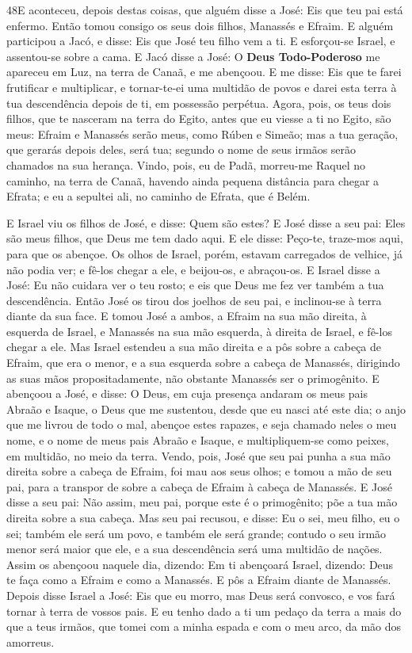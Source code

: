 \smallskip

\lettrine{48} E aconteceu, depois destas coisas, que alguém
disse a José: Eis que teu pai está enfermo. Então tomou consigo os
seus dois filhos, Manassés e Efraim. E alguém participou a Jacó,
e disse: Eis que José teu filho vem a ti. E esforçou-se Israel, e
assentou-se sobre a cama. E Jacó disse a José: O \textbf{Deus
Todo-Poderoso} me apareceu em Luz, na terra de Canaã, e me abençoou.
E me disse: Eis que te farei frutificar e multiplicar, e
tornar-te-ei uma multidão de povos e darei esta terra à tua
descendência depois de ti, em possessão perpétua. Agora, pois,
os teus dois filhos, que te nasceram na terra do Egito, antes que eu
viesse a ti no Egito, são meus: Efraim e Manassés serão meus, como
Rúben e Simeão; mas a tua geração, que gerarás depois deles,
será tua; segundo o nome de seus irmãos serão chamados na sua
herança. Vindo, pois, eu de Padã, morreu-me Raquel no caminho,
na terra de Canaã, havendo ainda pequena distância para chegar a
Efrata; e eu a sepultei ali, no caminho de Efrata, que é Belém.

E Israel viu os filhos de José, e disse: Quem são estes? E
José disse a seu pai: Eles são meus filhos, que Deus me tem dado
aqui. E ele disse: Peço-te, traze-mos aqui, para que os abençoe.
Os olhos de Israel, porém, estavam carregados de velhice, já
não podia ver; e fê-los chegar a ele, e beijou-os, e abraçou-os.
E Israel disse a José: Eu não cuidara ver o teu rosto; e eis
que Deus me fez ver também a tua descendência. Então José os
tirou dos joelhos de seu pai, e inclinou-se à terra diante da sua
face. E tomou José a ambos, a Efraim na sua mão direita, à
esquerda de Israel, e Manassés na sua mão esquerda, à direita de
Israel, e fê-los chegar a ele. Mas Israel estendeu a sua mão
direita e a pôs sobre a cabeça de Efraim, que era o menor, e a sua
esquerda sobre a cabeça de Manassés, dirigindo as suas mãos
propositadamente, não obstante Manassés ser o primogênito. E
abençoou a José, e disse: O Deus, em cuja presença andaram os meus
pais Abraão e Isaque, o Deus que me sustentou, desde que eu nasci
até este dia; o anjo que me livrou de todo o mal, abençoe
estes rapazes, e seja chamado neles o meu nome, e o nome de meus
pais Abraão e Isaque, e multipliquem-se como peixes, em multidão, no
meio da terra. Vendo, pois, José que seu pai punha a sua mão
direita sobre a cabeça de Efraim, foi mau aos seus olhos; e tomou a
mão de seu pai, para a transpor de sobre a cabeça de Efraim à cabeça
de Manassés. E José disse a seu pai: Não assim, meu pai,
porque este é o primogênito; põe a tua mão direita sobre a sua
cabeça. Mas seu pai recusou, e disse: Eu o sei, meu filho, eu
o sei; também ele será um povo, e também ele será grande; contudo o
seu irmão menor será maior que ele, e a sua descendência será uma
multidão de nações. Assim os abençoou naquele dia, dizendo:
Em ti abençoará Israel, dizendo: Deus te faça como a Efraim e como a
Manassés. E pôs a Efraim diante de Manassés. Depois disse
Israel a José: Eis que eu morro, mas Deus será convosco, e vos fará
tornar à terra de vossos pais. E eu tenho dado a ti um pedaço
da terra a mais do que a teus irmãos, que tomei com a minha espada e
com o meu arco, da mão dos amorreus.

